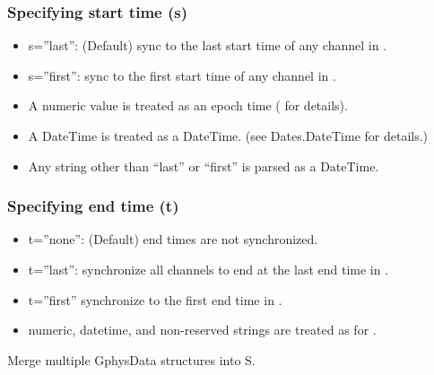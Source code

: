 \documentclass[letterpaper,11pt,english]{sphinxmanual}
\begin{document}
\subsubsection{Specifying start time (s)}
\label{\detokenize{src/Processing/processing:specifying-start-time-s}}\begin{itemize}
\item {} 
s=”last”: (Default) sync to the last start time of any channel in .

\item {} 
s=”first”: sync to the first start time of any channel in .

\item {} 
A numeric value is treated as an epoch time ( for details).

\item {} 
A DateTime is treated as a DateTime. (see Dates.DateTime for details.)

\item {} 
Any string other than “last” or “first” is parsed as a DateTime.

\end{itemize}


\subsubsection{Specifying end time (t)}
\label{\detokenize{src/Processing/processing:specifying-end-time-t}}\begin{itemize}
\item {} 
t=”none”: (Default) end times are not synchronized.

\item {} 
t=”last”: synchronize all channels to end at the last end time in .

\item {} 
t=”first” synchronize to the first end time in .

\item {} 
numeric, datetime, and non-reserved strings are treated as for .

\end{itemize}


\begin{fulllineitems}
\end{fulllineitems}


Merge multiple GphysData structures into S.
\end{document}

